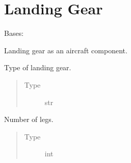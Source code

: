 \documentclass[letterpaper,10pt,english]{sphinxmanual}
\begin{document}
\section{Landing Gear}
\label{\detokenize{modules/landing_gear:module-landing_gear}}\label{\detokenize{modules/landing_gear:landing-gear}}\label{\detokenize{modules/landing_gear::doc}}

\begin{fulllineitems}
\label{\detokenize{modules/landing_gear:landing_gear.LandingGear}}
\sphinxAtStartPar
Bases: 

\sphinxAtStartPar
Landing gear as an aircraft component.

\begin{fulllineitems}
\label{\detokenize{modules/landing_gear:landing_gear.LandingGear.type_}}
\sphinxAtStartPar
Type of landing gear.
\begin{quote}\begin{description}
\item[{Type}] \leavevmode
\sphinxAtStartPar
str

\end{description}\end{quote}

\end{fulllineitems}


\begin{fulllineitems}
\label{\detokenize{modules/landing_gear:landing_gear.LandingGear.number_of_legs}}
\sphinxAtStartPar
Number of legs.
\begin{quote}\begin{description}
\item[{Type}] \leavevmode
\sphinxAtStartPar
int

\end{description}\end{quote}

\end{fulllineitems}


\end{fulllineitems}
\end{document}
